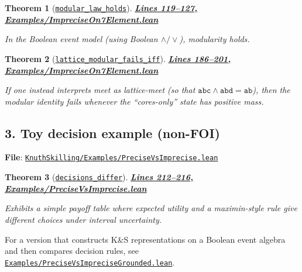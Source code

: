 \documentclass[11pt]{article}
\newtheorem{theorem}{Theorem}[section]
\theoremstyle{definition}
\theoremstyle{remark}
\begin{document}
\begin{theorem}[\href{https://github.com/zariuq/ks-foundations-of-inference/blob/main/KnuthSkilling/Examples/ImpreciseOn7Element.lean\#L124}{\texttt{modular\_law\_holds}}]
\textbf{\href{https://github.com/zariuq/ks-foundations-of-inference/blob/main/KnuthSkilling/Examples/ImpreciseOn7Element.lean\#L119-L127}{Lines 119--127, Examples/ImpreciseOn7Element.lean}}

In the Boolean event model (using Boolean $\wedge/\vee$), modularity holds.
\end{theorem}

\begin{theorem}[\href{https://github.com/zariuq/ks-foundations-of-inference/blob/main/KnuthSkilling/Examples/ImpreciseOn7Element.lean\#L197}{\texttt{lattice\_modular\_fails\_iff}}]
\textbf{\href{https://github.com/zariuq/ks-foundations-of-inference/blob/main/KnuthSkilling/Examples/ImpreciseOn7Element.lean\#L186-L201}{Lines 186--201, Examples/ImpreciseOn7Element.lean}}

If one instead interprets meet as lattice-meet (so that $\texttt{abc} \wedge \texttt{abd} = \texttt{ab}$),
then the modular identity fails whenever the ``cores-only'' state has positive mass.
\end{theorem}

\subsection*{3. Toy decision example (non-FOI)}

\textbf{File}: \href{https://github.com/zariuq/ks-foundations-of-inference/blob/main/KnuthSkilling/Examples/PreciseVsImprecise.lean}{\texttt{KnuthSkilling/Examples/PreciseVsImprecise.lean}}

\begin{theorem}[\href{https://github.com/zariuq/ks-foundations-of-inference/blob/main/KnuthSkilling/Examples/PreciseVsImprecise.lean\#L212}{\texttt{decisions\_differ}}]
\textbf{\href{https://github.com/zariuq/ks-foundations-of-inference/blob/main/KnuthSkilling/Examples/PreciseVsImprecise.lean\#L212-L216}{Lines 212--216, Examples/PreciseVsImprecise.lean}}

Exhibits a simple payoff table where expected utility and a maximin-style rule give different choices
under interval uncertainty.
\end{theorem}

For a version that constructs K\&S representations on a Boolean event algebra and then compares
decision rules, see \href{https://github.com/zariuq/ks-foundations-of-inference/blob/main/KnuthSkilling/Examples/PreciseVsImpreciseGrounded.lean}{\texttt{Examples/PreciseVsImpreciseGrounded.lean}}.
\end{document}
